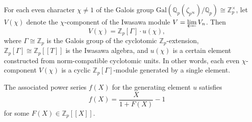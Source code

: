 For each even character $\chi \neq 1$ of the Galois group $\mathrm{Gal}(\mathbb{Q}_p(\zeta_{p^\infty})/\mathbb{Q}_p) \cong \mathbb{Z}_p^\times$, let $V(\chi)$ denote the $\chi$-component of the Iwasawa module $V = \varprojlim V_n$. Then
$$V(\chi) = \mathbb{Z}_p[\Gamma] \cdot u(\chi),$$
where $\Gamma \cong \mathbb{Z}_p$ is the Galois group of the cyclotomic $\mathbb{Z}_p$-extension, $\mathbb{Z}_p[\Gamma] \cong \mathbb{Z}_p[[T]]$ is the Iwasawa algebra, and $u(\chi)$ is a certain element constructed from norm-compatible cyclotomic units. In other words, each even $\chi$-component $V(\chi)$ is a cyclic $\mathbb{Z}_p[\Gamma]$-module generated by a single element.

The associated power series $f(X)$ for the generating element $u$ satisfies
$$f(X) = \frac{X}{1 + F(X)} - 1$$
for some $F(X) \in \mathbb{Z}_p[[X]]$.
